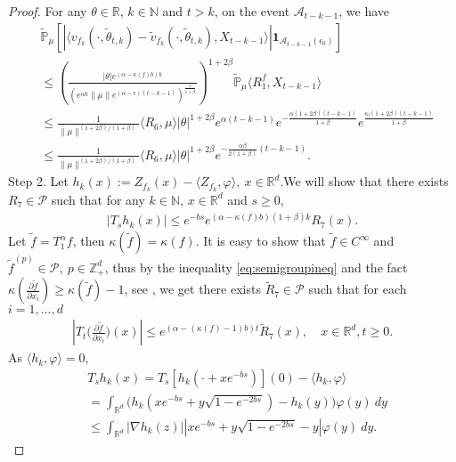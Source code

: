 \documentclass[12pt, a4paper]{amsart}
\theoremstyle{definition}
\numberwithin{equation}{section}
\begin{document}
\begin{proof}
For any $\theta\in \mathbb{R}$, $k\in \mathbb{N}$ and $t>k$, on the event $\mathcal{A}_{t-k-1}$, we have
    \begin{align*}
        &\mathbb{\tilde{P}}_{\mu}\left[\left|\langle v_{f_k}(\cdot,\tilde{\theta}_{t,k})-\tilde{v}_{f_k}(\cdot,\tilde{\theta}_{t,k}), X_{t-k-1}\rangle\right|\mathbf{1}_{\mathcal{A}_{t-k-1}(\epsilon_0)}\right]
        \\ &\leq \left(\frac{|\theta|e^{(\alpha-\kappa(f)b)k}}{(e^{\alpha k}\|\mu\|e^{(\alpha-\epsilon)(t-k-1)})^\frac{1}{1+\beta}}\right)^{1+2\beta}\mathbb{\tilde{P}}_{\mu}\langle R^f_1,X_{t-k-1}\rangle\\
        &\leq\frac{1}{\|\mu\|^{(1+2\beta)/(1+\beta)}}\langle R_6,\mu\rangle|\theta|^{1+2\beta}e^{\alpha(t-k-1)} e^{-\frac{\alpha(1+2\beta)(t-k-1)}{1+\beta}}e^{\frac{\epsilon_0(1+2\beta)(t-k-1)}{1+\beta}}\\
        &\leq \frac{1}{\|\mu\|^{(1+2\beta)/(1+\beta)}}\langle R_6,\mu\rangle|\theta|^{1+2\beta}e^{-\frac{\alpha\beta}{2(1+\beta)}(t-k-1)}.
    \end{align*}
 Step 2. Let $h_k(x):=Z_{f_k}(x)-\langle Z_{f_k},\varphi\rangle,~x\in\mathbb{R}^d$.We will show that there exists $R_7\in \mathcal{P}$ such that for any $k\in\mathbb{N}$, $x\in \mathbb{R}^d$ and $s\geq 0$,
 \begin{align}
 \label{eq:31step2}
     |T_s h_k(x)|\leq e^{-bs}e^{(\alpha-\kappa(f)b)(1+\beta)k}R_7(x).
 \end{align}
 Let $\tilde{f}=T_1^{\alpha}f$, then $\kappa(\tilde{f})=\kappa(f)$. It is easy to show that $\tilde{f}\in C^{\infty}$ and $\tilde{f}^{(p)}\in\mathcal{P},~p\in\mathbb{Z}_+^d$, thus by the inequality \eqref{eq:semigroupineq} and the fact $\kappa\left(\frac{\partial \tilde{f}}{\partial x_i}\right)\geq \kappa(\tilde{f})-1$, see \cite[Lemma 2.3]{RSZ}, we get there exists $\tilde{R}_7\in \mathcal{P}$ such that for each $i=1,...,d$
 \begin{align}
 \label{ineq-temp}
     \left|T_t\big(\frac{\partial\tilde{f}}{\partial x_i}\big)(x)\right|\leq e^{(\alpha-(\kappa(f)-1)b)t}\tilde{R}_7(x), \quad x\in \mathbb {R}^d, t\geq 0.
 \end{align}
 As $\langle h_k,\varphi\rangle=0$,
 \begin{align}
     &T_s h_k(x)= T_s [h_k(\cdot+xe^{-bs})] (0)-\langle h_k,\varphi\rangle
     \\ &= \int_{\mathbb{R}^d}\big(h_k(xe^{-bs}+y\sqrt{1-e^{-2bs}})-h_k(y)\big)\varphi (y)~dy
     \\ &\leq \int_{\mathbb{R}^d}|\nabla h_k(z)||xe^{-bs}+y\sqrt{1-e^{-2bs}}-y|\varphi (y)~dy.

\end{align}
\end{proof}
\end{document}

